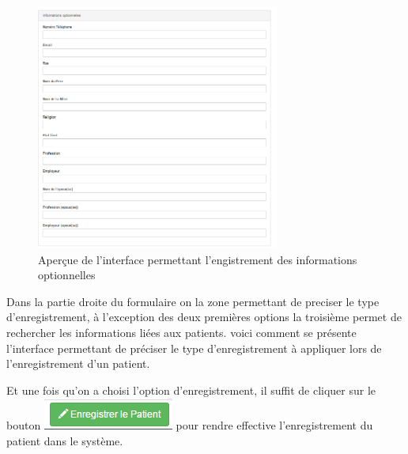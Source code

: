 \documentclass[12pt,a4paper]{report}
\begin{document}
\begin{figure}[h]
\begin{center}
\includegraphics[width=8cm]{pic/InfoOptionnel.png}
\end{center}
\caption{Aperçue de l'interface permettant l'engistrement des informations optionnelles}
\label{Aperçue de l'interface permettant l'engistrement des informations optionnelles}
\end{figure} 
Dans la partie droite du formulaire on la zone permettant de preciser le type d'enregistrement, à l'exception des deux premières options la troisième permet de rechercher les informations liées aux patients. voici comment se présente l'interface permettant de préciser le type d'enregistrement à appliquer lors de l'enregistrement d'un patient. 

Et une fois qu'on a choisi l'option d'enregistrement, il suffit de cliquer sur le bouton \includegraphics[scale=0.7]{pic/EnregPatient.png} pour rendre effective l'enregistrement du patient dans le système.
\end{document}
